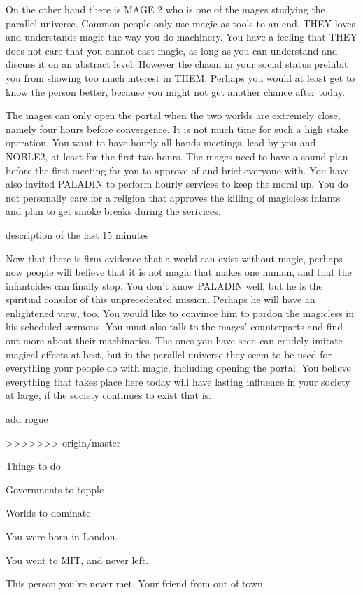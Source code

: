 \documentclass[char]{guildcamp3}
\begin{document}
On the other hand there is MAGE 2 who is one of the mages studying the parallel universe. Common people only use magic as tools to an end. THEY loves and understands magic the way you do machinery. You have a feeling that THEY does not care that you cannot cast magic, as long as you can understand and discuss it on an abstract level. However the chasm in your social status prehibit you from showing too much interest in THEM. Perhaps you would at least get to know the person better, because you might not get another chance after today.

The mages can only open the portal when the two worlds are extremely close, namely four hours before convergence. It is not much time for such a high stake operation. You want to have hourly all hands meetings, lead by you and NOBLE2, at least for the first two hours. The mages need to have a sound plan before the first meeting for you to approve of and brief everyone with. You have also invited PALADIN to perform hourly services to keep the moral up. You do not personally care for a religion that approves the killing of magicless infants and plan to get smoke breaks during the serivices.

description of the last 15 minutes 

Now that there is firm evidence that a world can exist without magic, perhaps now people will believe that it is not magic that makes one human, and that the infantcides can finally stop. You don't know PALADIN well, but he is the spiritual consilor of this unprecedented mission. Perhaps he will have an enlightened view, too. You would like to convince him to pardon the magicless in his scheduled sermons. You must also talk to the mages' counterparts and find out more about their machinaries. The ones you have seen can crudely imitate magical effects at best, but in the parallel universe they seem to be used for everything your people do with magic, including opening the portal. You believe everything that takes place here today will have lasting influence in your society at large, if the society continues to exist that is.

add rogue


>>>>>>> origin/master
\begin{itemz}[Goals]
  \item Things to do
  \item Governments to topple
  \item Worlds to dominate
\end{itemz}

\begin{itemz}[Notes]
  \item You were born in London.
  \item You went to MIT, and never left.
\end{itemz}


\begin{contacts}
  \contact{\cNPC{}} This person you've never met.
  \contact{\cSomeGuy{}} Your friend from out of town.
\end{contacts}
\end{document}
